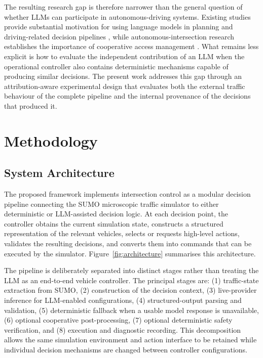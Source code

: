 \documentclass[letterpaper,10pt,conference]{ieeeconf}
\begin{document}
The resulting research gap is therefore narrower than the general question of whether LLMs can participate in autonomous-driving systems. Existing studies provide substantial motivation for using language models in planning and driving-related decision pipelines \cite{Wen2023,Jin2023,Cui2024,Yang2024,Li2024}, while autonomous-intersection research establishes the importance of cooperative access management \cite{Dresner2008,Safarov2022,Zhao2025}. What remains less explicit is how to evaluate the independent contribution of an LLM when the operational controller also contains deterministic mechanisms capable of producing similar decisions. The present work addresses this gap through an attribution-aware experimental design that evaluates both the external traffic behaviour of the complete pipeline and the internal provenance of the decisions that produced it.



\section{Methodology}



\subsection{System Architecture}



The proposed framework implements intersection control as a modular decision pipeline connecting the SUMO microscopic traffic simulator \cite{AlvarezLopez2018} to either deterministic or LLM-assisted decision logic. At each decision point, the controller obtains the current simulation state, constructs a structured representation of the relevant vehicles, selects or requests high-level actions, validates the resulting decisions, and converts them into commands that can be executed by the simulator. Figure~\ref{fig:architecture} summarises this architecture.



The pipeline is deliberately separated into distinct stages rather than treating the LLM as an end-to-end vehicle controller. The principal stages are: (1) traffic-state extraction from SUMO, (2) construction of the decision context, (3) live-provider inference for LLM-enabled configurations, (4) structured-output parsing and validation, (5) deterministic fallback when a usable model response is unavailable, (6) optional cooperative post-processing, (7) optional deterministic safety verification, and (8) execution and diagnostic recording. This decomposition allows the same simulation environment and action interface to be retained while individual decision mechanisms are changed between controller configurations.
\end{document}
